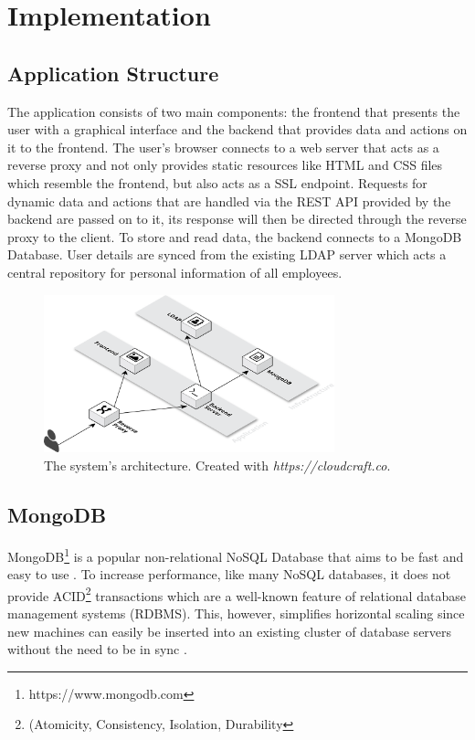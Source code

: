 \chapter{Implementation}
\section{Application Structure}
The application consists of two main components: the frontend that presents the user with a graphical interface and the backend that provides data and actions on it to the frontend.
The user's browser connects to a web server that acts as a reverse proxy and not only provides static resources like HTML and CSS files which resemble the frontend, but also acts as a SSL endpoint.
Requests for dynamic data and actions that are handled via the REST API provided by the backend are passed on to it, its response will then be directed through the reverse proxy to the client.
To store and read data, the backend connects to a MongoDB Database. User details are synced from the existing LDAP server which acts a central repository for personal information of all employees.
\begin{figure}[!htp]
    \centering
    \includegraphics[width=0.75\textwidth]{images/system_architecture.png}
    \caption[System Architecture]{The system's architecture. Created with \textit{https://cloudcraft.co}.}
    \label{fig:markovchain}
\end{figure}

\section{MongoDB}
MongoDB\footnote{https://www.mongodb.com} is a popular non-relational NoSQL Database that aims to be fast and easy to use \cite[p. 10]{MongoGuide}. To increase performance, like many NoSQL databases, it does not provide ACID\footnote{(Atomicity, Consistency, Isolation, Durability} transactions which are a well-known feature of relational database management systems (RDBMS). This, however, simplifies horizontal scaling since new machines can easily be inserted into an existing cluster of database servers without the need to be in sync \cite[p. 3]{MongoGuide}.

